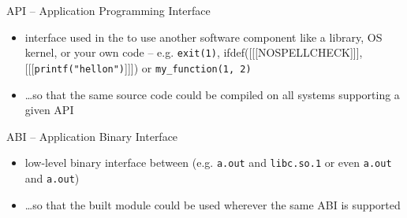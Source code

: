 \begin{slide}

API -- Application Programming Interface

\begin{itemize}
\item interface used in the  to use another software
component like a library, OS kernel, or your own code -- e.g.
\texttt{exit(1)}, ifdef([[[NOSPELLCHECK]]],
[[[\texttt{printf("hello\bs{}n")}]]]) or \texttt{my\_function(1,
2)}
\item \dots{}so that the same source code could be compiled on all systems
supporting a given API
\end{itemize}

ABI -- Application Binary Interface

\begin{itemize}
\item low-level binary interface between  (e.g.  \texttt{a.out}
and \texttt{libc.so.1} or even \texttt{a.out} and \texttt{a.out})
\item \dots{}so that the built module could be used wherever the same ABI is
supported
\end{itemize}
\end{slide}


